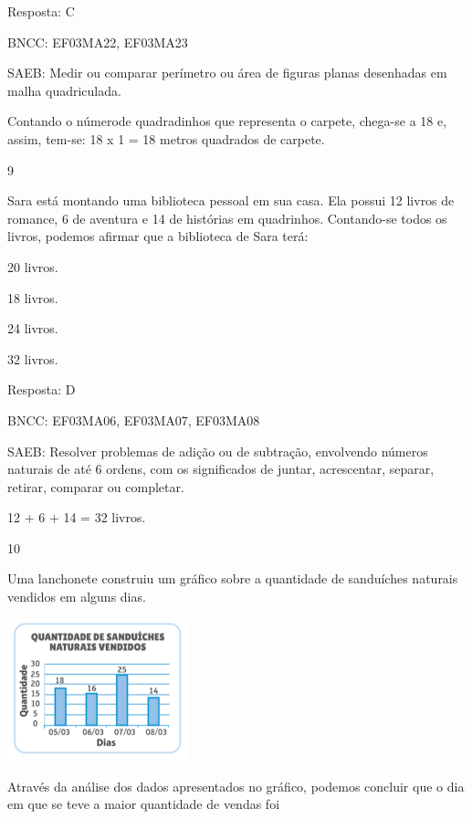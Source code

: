 \begin{escolha}
{\begin{escolha}
{Resposta: C

BNCC: EF03MA22, EF03MA23

SAEB: Medir ou comparar perímetro ou área de figuras planas
desenhadas em malha quadriculada.

Contando o númerode quadradinhos que representa o carpete, chega-se a 18 e,
assim, tem-se: 18 x 1 = 18 metros quadrados de carpete.

\num{9}

Sara está montando uma biblioteca pessoal em sua casa. Ela possui 12
livros de romance, 6 de aventura e 14 de histórias em quadrinhos.
Contando-se todos os livros, podemos afirmar que a biblioteca de Sara terá:

\begin{escolha}
\item
  20 livros.
\item
  18 livros.
\item
  24 livros.
\item
  32 livros.
\end{escolha}

Resposta: D

BNCC: EF03MA06, EF03MA07, EF03MA08

SAEB: Resolver problemas de adição ou de subtração,
envolvendo números naturais de até 6 ordens, com os significados de
juntar, acrescentar, separar, retirar, comparar ou completar.

12 + 6 + 14 = 32 livros.

\num{10}

Uma lanchonete construiu um gráfico sobre a quantidade de sanduíches
naturais vendidos em alguns dias.

\includegraphics[width=2.05128in,height=1.61850in]{media/image124.png}


Através da análise dos dados apresentados no gráfico, podemos concluir
que o dia em que se teve a maior quantidade de vendas foi

\begin{escolha}


\end{escolha}}
\end{escolha}}
\end{escolha}
